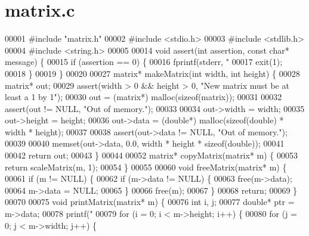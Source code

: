 \section{matrix.\+c}
\label{matrix_8c_source}

\begin{DoxyCode}
00001 \textcolor{preprocessor}{#include "matrix.h"}
00002 \textcolor{preprocessor}{#include <stdio.h>}
00003 \textcolor{preprocessor}{#include <stdlib.h>}
00004 \textcolor{preprocessor}{#include <string.h>}
00005 
00014 \textcolor{keywordtype}{void} assert(\textcolor{keywordtype}{int} assertion, \textcolor{keyword}{const} \textcolor{keywordtype}{char}* message) \{
00015     \textcolor{keywordflow}{if} (assertion == 0) \{
00016         fprintf(stderr, \textcolor{stringliteral}{"%
00017         exit(1);
00018     \}
00019 \}
00020 
00027 matrix* makeMatrix(\textcolor{keywordtype}{int} width, \textcolor{keywordtype}{int} height) \{
00028     matrix* out;
00029     assert(width > 0 && height > 0, \textcolor{stringliteral}{"New matrix must be at least a 1 by 1"});
00030     out = (matrix*) malloc(\textcolor{keyword}{sizeof}(matrix));
00031 
00032     assert(out != NULL, \textcolor{stringliteral}{"Out of memory."});
00033 
00034     out->width = width;
00035     out->height = height;
00036     out->data = (\textcolor{keywordtype}{double}*) malloc(\textcolor{keyword}{sizeof}(\textcolor{keywordtype}{double}) * width * height);
00037 
00038     assert(out->data != NULL, \textcolor{stringliteral}{"Out of memory."});
00039 
00040     memset(out->data, 0.0, width * height * \textcolor{keyword}{sizeof}(\textcolor{keywordtype}{double}));
00041 
00042     \textcolor{keywordflow}{return} out;
00043 \}
00044 
00052 matrix* copyMatrix(matrix* m) \{
00053     \textcolor{keywordflow}{return} scaleMatrix(m, 1);
00054 \}
00055 
00060 \textcolor{keywordtype}{void} freeMatrix(matrix* m) \{
00061     \textcolor{keywordflow}{if} (m != NULL) \{
00062         \textcolor{keywordflow}{if} (m->data != NULL) \{
00063             free(m->data);
00064             m->data = NULL;
00065         \}
00066         free(m);
00067     \}
00068     \textcolor{keywordflow}{return};
00069 \}
00070 
00075 \textcolor{keywordtype}{void} printMatrix(matrix* m) \{
00076     \textcolor{keywordtype}{int} i, j;
00077     \textcolor{keywordtype}{double}* ptr = m->data;
00078     printf(\textcolor{stringliteral}{"%
00079     \textcolor{keywordflow}{for} (i = 0; i < m->height; i++) \{
00080         \textcolor{keywordflow}{for} (j = 0; j < m->width; j++) \{
}}
\end{DoxyCode}
